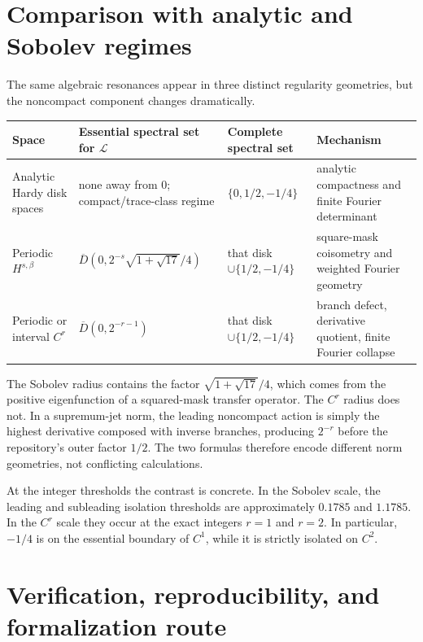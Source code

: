 \documentclass[11pt,a4paper]{article}
\theoremstyle{definition}
\theoremstyle{remark}
\newcommand{\Dbar}[1]{\overline{D}(0,#1)}
\newcommand{\Lop}{\mathcal L}
\begin{document}
\section{Comparison with analytic and Sobolev regimes}
\label{sec:comparison}

The same algebraic resonances appear in three distinct regularity geometries,
but the noncompact component changes dramatically.

\begin{center}
\small
\begin{tabularx}{\textwidth}{@{}L{0.24\textwidth}L{0.25\textwidth}YY@{}}
\toprule
Space & Essential spectral set for $\Lop$ & Complete spectral set & Mechanism\\
\midrule
Analytic Hardy disk spaces & none away from $0$; compact/trace-class regime
& $\{0,1/2,-1/4\}$
& analytic compactness and finite Fourier determinant\\
Periodic $H^{s,\beta}$ &
$\Dbar{2^{-s}\sqrt{1+\sqrt{17}}/4}$
& that disk $\cup\{1/2,-1/4\}$
& square-mask coisometry and weighted Fourier geometry\\
Periodic or interval $C^r$ & $\Dbar{2^{-r-1}}$
& that disk $\cup\{1/2,-1/4\}$
& branch defect, derivative quotient, finite Fourier collapse\\
\bottomrule
\end{tabularx}
\end{center}

The Sobolev radius contains the factor
$\sqrt{1+\sqrt{17}}/4$, which comes from the positive eigenfunction of a
squared-mask transfer operator.  The $C^r$ radius does not.  In a supremum-jet
norm, the leading noncompact action is simply the highest derivative composed
with inverse branches, producing $2^{-r}$ before the repository's outer
factor $1/2$.  The two formulas therefore encode different norm geometries,
not conflicting calculations.

At the integer thresholds the contrast is concrete.  In the Sobolev scale,
the leading and subleading isolation thresholds are approximately
$0.1785$ and $1.1785$.  In the $C^r$ scale they occur at the exact integers
$r=1$ and $r=2$.  In particular, $-1/4$ is on the essential boundary of
$C^1$, while it is strictly isolated on $C^2$.

\section{Verification, reproducibility, and formalization route}
\label{sec:verification-overview}
\end{document}
